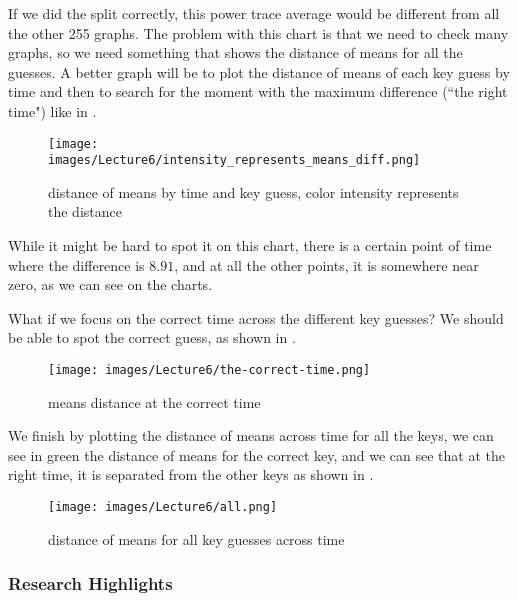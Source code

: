 If we did the split correctly, this power trace average would be different from all the other 255 graphs. 
The problem with this chart is that we need to check many graphs, so we need something that shows the distance of means for all the guesses. 
A better graph will be to plot the distance of means of each key guess by time and then to search for the moment with the maximum difference (``the right time") like in .

\begin{figure}[!ht]
    \centering
    \texttt{[image: images/Lecture6/intensity\_represents\_means\_diff.png]}
    \caption{distance of means by time and key guess, color intensity represents the distance} \label{fig:intensity_represents_means_diff}
\end{figure}

While it might be hard to spot it on this chart, there is a certain point of time where the difference is $8.91$, and at all the other points, it is somewhere near zero, as we can see on the charts.

What if we focus on the correct time across the different key guesses? We should be able to spot the correct guess, as shown in .

\begin{figure}[!ht]
    \centering
    \texttt{[image: images/Lecture6/the-correct-time.png]}
    \caption{means distance at the correct time} \label{fig:the-correct-time}
\end{figure}

We finish by plotting the distance of means across time for all the keys, we can see in green the distance of means for the correct key, and we can see that at the right time, it is separated from the other keys as shown in .

\begin{figure}[!ht]
    \centering
    \texttt{[image: images/Lecture6/all.png]}
    \caption{distance of means for all key guesses across time \linebreak[4]} \label{fig:all}
\end{figure}

\subsubsection{Research Highlights}

